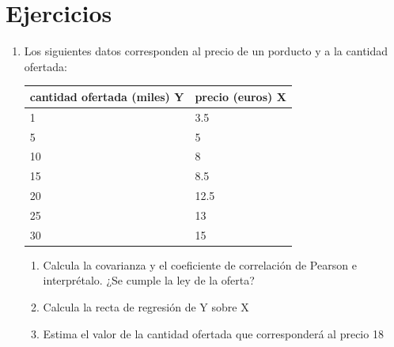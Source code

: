 \documentclass[]{book}
\providecommand{\tightlist}{%
  \setlength{\itemsep}{0pt}\setlength{\parskip}{0pt}}
\theoremstyle{plain}
\theoremstyle{definition}
\begin{document}
\hypertarget{ejercicios}{%
\section{Ejercicios}\label{ejercicios}}

\begin{enumerate}
\def\labelenumi{\arabic{enumi}.}
\item
  Los siguientes datos corresponden al precio de un porducto y a la
  cantidad ofertada:

  \begin{longtable}[]{@{}ll@{}}
  \toprule
  cantidad ofertada (miles) Y & precio (euros) X\tabularnewline
  \midrule
  \endhead
  1 & 3.5\tabularnewline
  5 & 5\tabularnewline
  10 & 8\tabularnewline
  15 & 8.5\tabularnewline
  20 & 12.5\tabularnewline
  25 & 13\tabularnewline
  30 & 15\tabularnewline
  \bottomrule
  \end{longtable}

  \begin{enumerate}
  \def\labelenumii{\arabic{enumii}.}
  \tightlist
  \item
    Calcula la covarianza y el coeficiente de correlación de Pearson e
    interprétalo. ¿Se cumple la ley de la oferta?
  \item
    Calcula la recta de regresión de Y sobre X
  \item
    Estima el valor de la cantidad ofertada que corresponderá al precio
    18
  \end{enumerate}
\end{enumerate}
\end{document}
